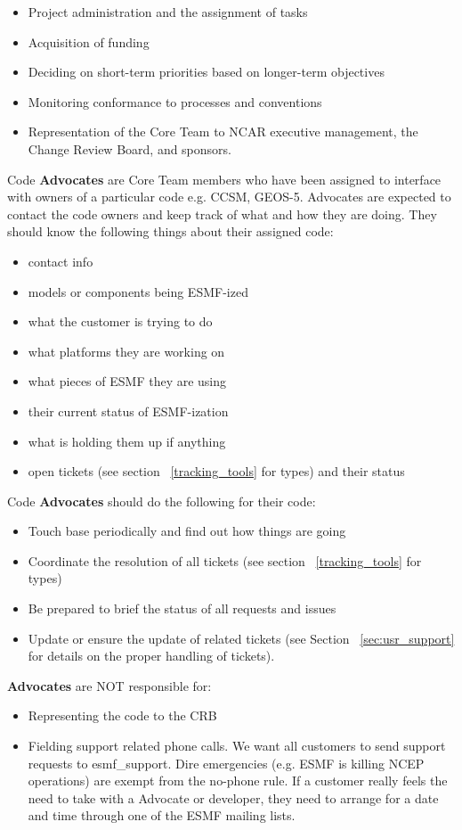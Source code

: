 \begin{itemize}
\item Project administration and the assignment of  tasks
\item Acquisition of funding
\item Deciding on short-term priorities based on longer-term objectives
\item Monitoring conformance to processes and conventions
\item Representation of the Core Team to NCAR executive management, the Change Review 
Board, and sponsors.
\end{itemize}

Code {\bf Advocates} are Core Team members who have been assigned to interface with owners of
a particular code e.g. CCSM, GEOS-5. Advocates are expected to contact the code owners and keep track of what and how they are doing. They should know the following things about their assigned code:

\begin{itemize}
\item contact info
\item models or components being ESMF-ized
\item what the customer is trying to do
\item what platforms they are working on
\item what pieces of ESMF they are using
\item their current status of ESMF-ization
\item what is holding them up if anything
\item open tickets (see section ~\ref{tracking_tools} for types) and their status
\end{itemize}

Code {\bf Advocates} should do the following for their code:
\begin{itemize}
\item Touch base periodically and find out how things are going
\item Coordinate the resolution of all tickets (see section ~\ref{tracking_tools} for types)
\item Be prepared to brief the status of all requests and issues
\item Update or ensure the update of related tickets (see Section ~\ref{sec:usr_support} for details on
the proper handling of tickets).
\end{itemize}

{\bf Advocates} are NOT responsible for:
\begin{itemize}
\item Representing the code to the CRB
\item Fielding support related phone calls. We want all customers to send support requests to esmf\_support. Dire emergencies (e.g. ESMF is killing NCEP operations) are exempt from the no-phone rule. If a customer
really feels the need to take with a Advocate or developer, they need to arrange for a date and time through
one of the ESMF mailing lists.
\end {itemize}

